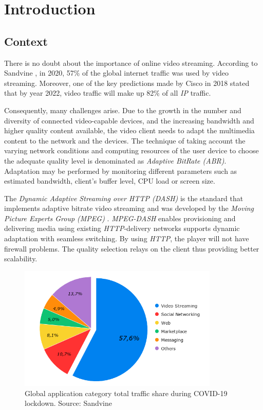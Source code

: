\chapter{Introduction}
\label{chap:introduction}

\section{Context}
\label{sec:context}

There is no doubt about the importance of online video streaming.
According to Sandvine \cite{sandvine1},
in 2020, 57\% of the global internet traffic was used by video streaming.
Moreover, one of the key predictions made by Cisco in 2018 \cite{cisco1}
stated that by year 2022, video traffic will make up 82\% 
of all \textit{IP} traffic.


Consequently, many challenges arise. Due to the growth in the 
number and diversity of connected video-capable devices, and the 
increasing bandwidth and higher quality content available, the
video client needs to adapt the multimedia content to
the network and the devices. The technique of taking account the 
varying network conditions and computing resources of the user 
device to choose the adequate quality level is denominated as
\textit{Adaptive BitRate (ABR)}. Adaptation may be performed by
monitoring different parameters such as estimated bandwidth,
client's buffer level, CPU load or screen size.


The \textit{Dynamic Adaptive Streaming over HTTP (DASH)} is the
standard that implements adaptive bitrate video streaming and was developed
by the \textit{Moving Picture Experts Group (MPEG)} \cite{dash1}. \textit{MPEG-DASH} 
enables provisioning and delivering media using existing \textit{HTTP}-delivery 
networks supports dynamic adaptation with seamless switching. By using
\textit{HTTP}, the player will not have firewall problems. The quality selection 
relays on the client thus providing better scalability.

  
\begin{figure}[h]
  \label{fig:chart1}
    \centering
    \includegraphics[width=0.85\textwidth]{img/chart2.png}
    \caption{Global application category total traffic share during COVID-19 lockdown. Source: Sandvine \cite{sandvine1}}
  \end{figure}
  
